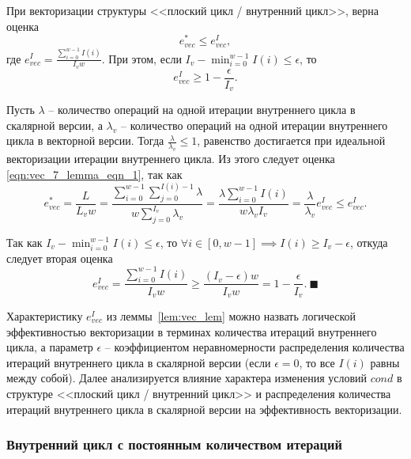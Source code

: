 \begin{lemma}\label{lem:vec_lem}
При векторизации структуры <<плоский цикл / внутренний цикл>>, верна оценка
\begin{equation}\label{eqn:vec_7_lemma_eqn_1}
e_{vec}^{*} \le e_{vec}^I,
\end{equation}
где $e_{vec}^I = \frac{ \sum_{i = 0}^{w - 1}{I(i)} }{I_v w}$.
При этом, если $I_v - \min_{i = 0}^{w - 1}{I(i)} \le \epsilon$, то
\begin{equation}\label{eqn:vec_7_lemma_eqn_2}
e_{vec}^I \ge 1 - \frac{\epsilon}{I_v}.
\end{equation}
\end{lemma}

Пусть $\lambda$ -- количество операций на одной итерации внутреннего цикла в скалярной версии, а $\lambda_v$ -- количество операций на одной итерации внутреннего цикла в векторной версии. 
Тогда $\frac{\lambda}{\lambda_v} \le 1$, равенство достигается при идеальной векторизации итерации внутреннего цикла.
Из этого следует оценка \eqref{eqn:vec_7_lemma_eqn_1}, так как
\begin{equation}
	e_{vec}^{*} = \frac{L}{L_v w} = \frac{\sum_{i = 0}^{w - 1}{\sum_{j = 0}^{I(i) - 1}{\lambda}}}{w \sum_{j = 0}^{I_v}{\lambda_v}} = \frac{\lambda \sum_{i = 0}^{w - 1}{I(i)}}{w \lambda_v I_v} = \frac{\lambda}{\lambda_v} e_{vec}^I \le e_{vec}^I.
\end{equation}

Так как $I_v - \min_{i = 0}^{w - 1}{I(i)} \le \epsilon$, то $\forall i \in [0, w - 1] \implies I(i) \ge I_v - \epsilon$, откуда следует вторая оценка
\begin{equation}
	e_{vec}^I = \frac{\sum_{i = 0}^{w - 1}{I(i)}}{I_v w} \ge \frac{(I_v - \epsilon) w}{I_v w} = 1 - \frac{\epsilon}{I_v}. \ \blacksquare
\end{equation}

Характеристику $e_{vec}^I$ из леммы~\ref{lem:vec_lem} можно назвать логической эффективностью векторизации в терминах количества итераций внутреннего цикла, а параметр $\epsilon$ -- коэффициентом неравномерности распределения количества итераций внутреннего цикла в скалярной версии (если $\epsilon = 0$, то все $I(i)$ равны между собой).
Далее анализируется влияние характера изменения условий $cond$ в структуре <<плоский цикл / внутренний цикл>> и распределения количества итераций внутреннего цикла в скалярной версии на эффективность векторизации.

\subsubsection{Внутренний цикл с постоянным количеством итераций}\label{sec:text_4_vec_mesh_intersect}

